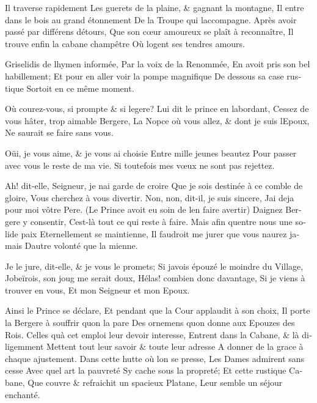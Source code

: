 \documentclass[14pt,a4paper]{memoir}
\begin{document}
{{\begin{otherlanguage}{french}
{Il traverse rapidement} {Les guerets de la plaine, \& gagnant la
montagne,} {Il entre dans le bois au grand étonnement} {De la Troupe qui
l\textquotesingle accompagne.} {Après avoir passé par différens
détours,} {Que son cœur amoureux se plaît à reconnaître,} {Il trouve
enfin la cabane champêtre} {Où logent ses tendres amours.}

{Griselidis de l\textquotesingle hymen informée,} {Par la voix de la
Renommée,} {En avoit pris son bel habillement;} {Et pour en aller voir
la pompe magnifique} {De dessous sa case rustique} {Sortoit en ce même
moment.}

{Où courez-vous, si prompte \& si legere?} {Lui dit le prince en
l\textquotesingle abordant,} {Cessez de vous hâter, trop aimable
Bergere,} {La Nopce où vous allez, \& dont je suis
l\textquotesingle Epoux,} {Ne saurait se faire sans vous.}

{Oüi, je vous aime, \& je vous ai choisie} {Entre mille jeunes beautez}
{Pour passer avec vous le reste de ma vie.} {Si toutefois mes vœux ne
sont pas rejettez. }

{Ah! dit-elle, Seigneur, je n\textquotesingle ai garde de croire } {Que
je sois destinée à ce comble de gloire,} {Vous cherchez à vous
divertir.} {Non, non, dit-il, je suis sincere,} {J\textquotesingle ai
deja pour moi vôtre Pere.} {(Le Prince avoit eu soin de
l\textquotesingle en faire avertir) } {Daignez Bergere y consentir,}
{C\textquotesingle est-là tout ce qui reste à faire.} {Mais afin
qu\textquotesingle entre nous une solide paix} {Eternellement se
maintienne,} {Il faudroit me jurer que vous n\textquotesingle aurez
jamais} {D\textquotesingle autre volonté que la mienne.}

{Je le jure, dit-elle, \& je vous le promets; } {Si
j\textquotesingle avois épouzé le moindre du Village,}
{J\textquotesingle obeïrois, son joug me serait doux,} {Hélas! combien
donc davantage,} {Si je viens à trouver en vous,} {Et mon Seigneur et
mon Epoux.}

{Ainsi le Prince se déclare,} {Et pendant que la Cour applaudit à son
choix,} {Il porte la Bergere à souffrir qu\textquotesingle on la pare}
{Des ornemens qu\textquotesingle on donne aux Epouzes des Rois.} {Celles
qu\textquotesingle à cet emploi leur devoir interesse,} {Entrent dans la
Cabane, \& là diligemment} {Mettent tout leur savoir \& toute leur
adresse } {A donner de la grace à chaque ajustement.} {Dans cette hutte
où l\textquotesingle on se presse,} {Les Dames admirent sans cesse}
{Avec quel art la pauvreté} {S\textquotesingle y cache sous la
propreté;} {Et cette rustique Cabane,} {Que couvre \& refraichit un
spacieux Platane, } {Leur semble un séjour enchanté.}


\end{otherlanguage}}}
\end{document}
